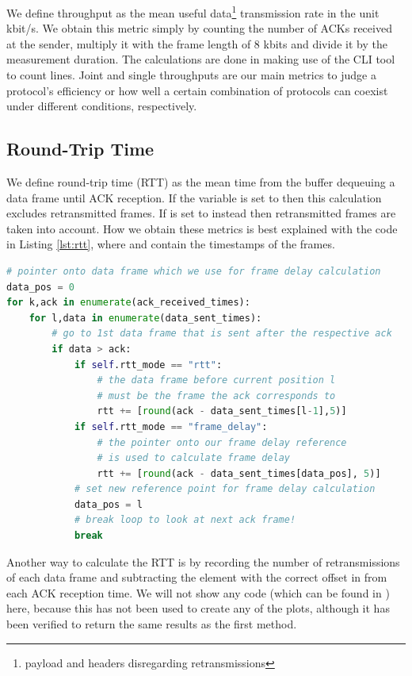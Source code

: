We define throughput as the mean useful data\footnote{payload and headers disregarding retransmissions} transmission rate in the unit kbit/s. We obtain this metric simply by counting the number of ACKs received at the sender, multiply it with the frame length of 8 kbits and divide it by the measurement duration. The calculations are done in  making use of the CLI tool  to count lines. Joint and single throughputs are our main metrics to judge a protocol's efficiency or how well a certain combination of protocols can coexist under different conditions, respectively.

\subsection{Round-Trip Time}
\label{sec:rtt}

We define round-trip time (RTT) as the mean time from the buffer dequeuing a data frame until ACK reception. If the variable  is set to  then this calculation excludes retransmitted frames. If  is set to  instead then retransmitted frames are taken into account. How we obtain these metrics is best explained with the code in Listing \ref{lst:rtt}, where  and  contain the timestamps of the frames. 

\begin{lstlisting}[language=Python, caption=The method used in \code{rtt\_alternative.py} to calculate RTT and frame delay,label=lst:rtt]
# pointer onto data frame which we use for frame delay calculation
data_pos = 0
for k,ack in enumerate(ack_received_times):
    for l,data in enumerate(data_sent_times):
		# go to 1st data frame that is sent after the respective ack 
        if data > ack:
            if self.rtt_mode == "rtt":
				# the data frame before current position l 
				# must be the frame the ack corresponds to
                rtt += [round(ack - data_sent_times[l-1],5)]
            if self.rtt_mode == "frame_delay":
				# the pointer onto our frame delay reference
				# is used to calculate frame delay
                rtt += [round(ack - data_sent_times[data_pos], 5)]
			# set new reference point for frame delay calculation
            data_pos = l
			# break loop to look at next ack frame!
            break
\end{lstlisting} 

Another way to calculate the RTT is by recording the number of retransmissions of each data frame and subtracting the element with the correct offset in  from each ACK reception time. We will not show any code (which can be found in ) here, because this has not been used to create any of the plots, although it has been verified to return the same results as the first method. 


